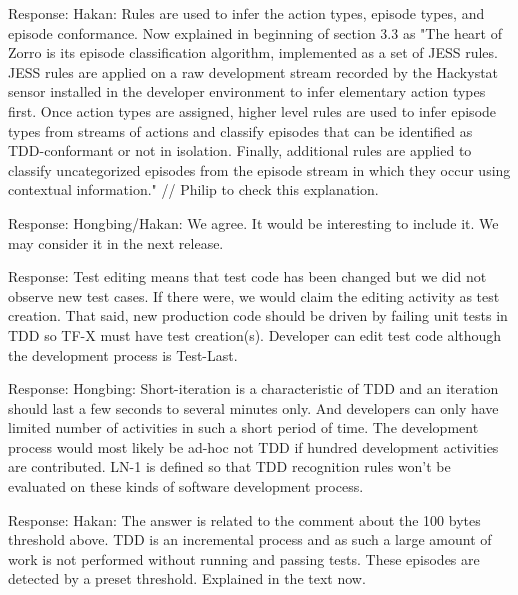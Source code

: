 \documentclass[11pt]{article}
\begin{document}
\noindent Response: Hakan: Rules are used to infer the action types, episode types, and episode conformance. Now explained in beginning of section 3.3 as "The heart of Zorro is its episode classification algorithm, implemented as
a set of JESS rules. JESS rules are applied on a raw development stream recorded by the Hackystat sensor
installed in the developer environment to infer elementary action types first. Once action types are
assigned, higher level rules are used to infer episode types from streams of actions and classify episodes that can be identified as TDD-conformant or not in isolation. Finally, additional rules are applied to classify uncategorized episodes from the episode stream in which they occur using contextual information." // Philip to check this explanation. 


\noindent Response: Hongbing/Hakan: We agree. It would be interesting to include it. We may consider it in the next release. 


\noindent Response: Test editing means that test code has been changed but we
did not observe new test cases. If there were, we would claim the editing activity as test creation.  That said, new production code should be driven by failing unit tests in TDD so TF-X must have test creation(s). Developer can edit test code although the development process is Test-Last. 


\noindent Response: Hongbing: Short-iteration is a characteristic of TDD and an iteration should last a few seconds to several minutes only. And developers can only have limited number of activities in such a short period of time. The development process would most likely be ad-hoc not TDD if hundred development activities are contributed. LN-1 is defined so that TDD recognition rules won't be evaluated on these kinds of software development process. 

\noindent Response: Hakan: The answer is related to the comment about the 100 bytes threshold above. TDD is an incremental process and as such a large amount of work is not performed without running and passing tests. These episodes are detected by a preset threshold. Explained in the text now.  
\end{document}
